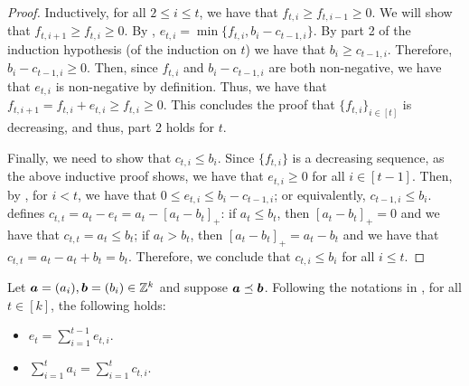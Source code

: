\documentclass[runningheads]{llncs}
\begin{document}
\begin{proof}
Inductively, for all $2\leq i\leq t$, we have that $f_{t,i}\geq f_{t,i-1}\geq 0$. We will show that $f_{t,i+1}\geq f_{t,i}\geq 0$. 
By , $e_{t,i} = \min\{f_{t,i}, b_i - c_{t-1, i}\}$. 
By part 2 of the induction hypothesis (of the induction on $t$)   we have that $b_i \geq c_{t-1,i}$. Therefore, $b_i - c_{t-1,i}\geq 0$. 
Then, since $f_{t,i}$ and $b_i - c_{t-1,i}$ are both non-negative, we have that $e_{t,i}$ is non-negative by definition. 
Thus, we have that $f_{t,i+1} = f_{t,i} + e_{t,i} \geq f_{t,i}\geq 0$. This concludes the proof that  $\{f_{t,i}\}_{i\in[t]}$ is decreasing, and thus, part 2 holds for $t$.

Finally, we need to show that $c_{t,i}\leq b_i$. 
Since $\{f_{t,i}\}$ is a decreasing sequence, as the above inductive proof shows, we have that $e_{t,i}\geq 0$ for all $i\in[t-1]$. 
Then, by , for $i<t$, we have that $0\leq e_{t,i}\leq b_i - c_{t-1, i}$; 
or equivalently, $c_{t-1, i}\leq b_i$. 
 defines $c_{t,t} = a_t - e_t = a_t - [a_t - b_t]_+$: if $a_t\leq b_t$, then $[a_t- b_t]_+= 0$ and we have that $c_{t,t} = a_t \leq b_t$; if $a_t> b_t$, then $[a_t - b_t]_+=a_t-b_t$ and we have that $c_{t,t} = a_t - a_t + b_t = b_t$.
Therefore, we conclude that $c_{t,i}\leq b_i$ for all $i\leq t.$
\end{proof}
\begin{lemma}\label{cor: c<=b}
Let $\boldsymbol a =(a_i), \boldsymbol b = (b_i)\in\mathbb Z^k$ and suppose $\boldsymbol a\preceq\boldsymbol b$. 
Following the notations in , for all $t\in[k]$, the following holds:
\begin{itemize}
    \item[(i)] $e_t = \sum_{i=1}^{t-1} e_{t,i}$. 
    \item[(ii)] $\sum_{i=1}^{t} a_i = \sum_{i=1}^{t} c_{t,i}$.
\end{itemize}
\end{lemma}
\end{document}
